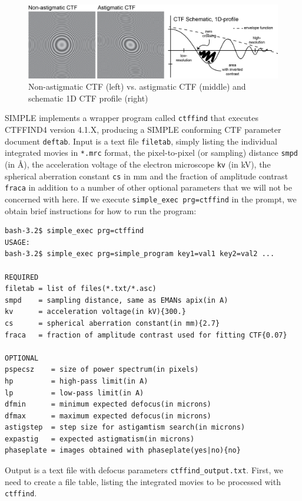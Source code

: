 \documentclass[a4paper,11pt]{article}
\newcommand{\prgname}[1]{\textcolor{NavyBlue}{\texttt{#1}}}
\begin{document}
\begin{figure}
\includegraphics[keepaspectratio=true,scale=0.8 ]{./astigctf/astigctf}
\caption{Non-astigmatic CTF (left) vs. astigmatic CTF (middle) and schematic 1D CTF profile (right)}
\end{figure}

SIMPLE implements a wrapper program called \prgname{ctffind} that executes CTFFIND4 \citep{rohou2015ctffind4} version 4.1.X, producing a SIMPLE conforming CTF parameter document \texttt{deftab}. Input is a text file \texttt{filetab}, simply listing the individual integrated movies in \texttt{*.mrc} format, the pixel-to-pixel (or sampling) distance \texttt{smpd} (in \AA{}), the acceleration voltage of the electron microscope \texttt{kv} (in kV), the spherical aberration constant \texttt{cs} in mm and the fraction of amplitude contrast \texttt{fraca} in addition to a number of other optional parameters that we will not be concerned with here. If we execute \texttt{simple\_exec prg=ctffind} in the prompt, we obtain brief instructions for how to run the program:
\begin{verbatim}
bash-3.2$ simple_exec prg=ctffind
USAGE:
bash-3.2$ simple_exec prg=simple_program key1=val1 key2=val2 ...

REQUIRED
filetab = list of files(*.txt/*.asc)
smpd    = sampling distance, same as EMANs apix(in A)
kv      = acceleration voltage(in kV){300.}
cs      = spherical aberration constant(in mm){2.7}
fraca   = fraction of amplitude contrast used for fitting CTF{0.07}

OPTIONAL
pspecsz    = size of power spectrum(in pixels)
hp         = high-pass limit(in A)
lp         = low-pass limit(in A)
dfmin      = minimum expected defocus(in microns)
dfmax      = maximum expected defocus(in microns)
astigstep  = step size for astigamtism search(in microns)
expastig   = expected astigmatism(in microns)
phaseplate = images obtained with phaseplate(yes|no){no}
\end{verbatim}
Output is a text file with defocus parameters \texttt{ctffind\_output.txt}. First, we need to create a file table, listing the integrated movies to be processed with  \prgname{ctffind}.
\end{document}
